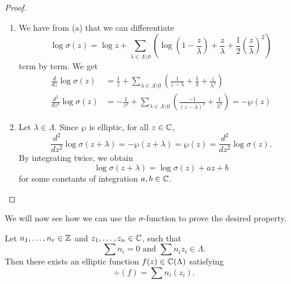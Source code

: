 \begin{proof}
\begin{enumerate}[label=(\alph*)]
		\item We have from (a) that we can differentiate
			\begin{equation*}
				\log \sigma(z) = \log z + 
				\sum_{\lambda \in \Lambda\setminus 0}
				\left(\log\left(1 - \frac{z}{\lambda}\right) +
				\frac{z}{\lambda} + \frac{1}{2}\left(
				\frac{z}{\lambda}\right)^2\right)
			\end{equation*}
			term by term.
			We get
			\begin{align*}
				\frac{d}{dz} \log \sigma(z)
				&= \frac{1}{z} +
				\sum_{\lambda \in \Lambda \setminus 0}
				\left(\frac{1}{z - \lambda}
				+ \frac{1}{\lambda} + \frac{z}{\lambda^2}\right)\\
				\frac{d^2}{dz^2} \log \sigma(z)
				&= -\frac{1}{z^2} + \sum_{\lambda \in \Lambda\setminus 0}
				\left(\frac{-1}{(z - \lambda)^2} + \frac{1}{\lambda^2}\right)
				= -\wp(z)
			\end{align*}

		\item Let $\lambda \in \Lambda$. Since $\wp$ is elliptic,
			for all $z \in \mathbb{C}$,
			\begin{equation*}
				\frac{d^2}{dz^2}\log\sigma(z + \lambda)
				= -\wp(z + \lambda) = \wp(z)
				= \frac{d^2}{dz^2}\log\sigma(z).
			\end{equation*}
			By integrating twice, we obtain
			\begin{equation*}
				\log \sigma(z + \lambda) = \log\sigma(z) + az + b
			\end{equation*}
			for some constants of integration $a, b \in \mathbb{C}$.
	\end{enumerate}
\end{proof}

We will now see how we can use the $\sigma$-function to prove the desired
property.

\begin{proposition}
	\label{prop:complex-divisors}
	Let $n_1, \dots, n_r \in \mathbb{Z}$ and $z_1, \dots, z_n \in \mathbb{C}$, such that
	\begin{equation*}
		\sum n_i = 0 \textrm{ and } \sum n_iz_i \in \Lambda.
	\end{equation*}
	Then there exists an elliptic function $f(z) \in \mathbb{C}(\Lambda)$ satisfying
	\begin{equation*}
		\div(f) = \sum n_i(z_i).
	\end{equation*}
\end{proposition}

